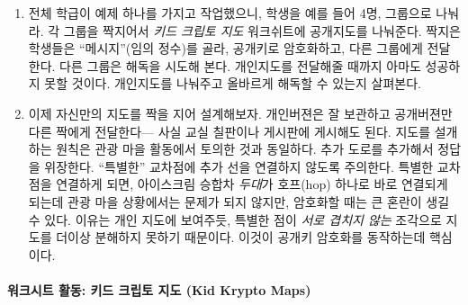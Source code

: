\documentclass[]{article}
\begin{document}
\begin{enumerate}
\item
  전체 학급이 예제 하나를 가지고 작업했으니, 학생을 예를 들어 4명,
  그룹으로 나눠라. 각 그룹을 짝지어서 \emph{키드 크립토 지도} 워크쉬트에
  공개지도를 나눠준다. 짝지은 학생들은 ``메시지''(임의 정수)를 골라,
  공개키로 암호화하고, 다른 그룹에게 전달한다. 다른 그룹은 해독을 시도해
  본다. 개인지도를 전달해줄 때까지 아마도 성공하지 못할 것이다.
  개인지도를 나눠주고 올바르게 해독할 수 있는지 살펴본다.
\item
  이제 자신만의 지도를 짝을 지어 설계해보자. 개인버젼은 잘 보관하고
  공개버젼만 다른 짝에게 전달한다--- 사실 교실 칠판이나 게시판에
  게시해도 된다. 지도를 설개하는 원칙은 관광 마을 활동에서 토의한 것과
  동일하다. 추가 도로를 추가해서 정답을 위장한다. ``특별한'' 교차점에
  추가 선을 연결하지 않도록 주의한다. 특별한 교차점을 연결하게 되면,
  아이스크림 승합차 \emph{두대}가 호프(hop) 하나로 바로 연결되게 되는데
  관광 마을 상황에서는 문제가 되지 않지만, 암호화할 때는 큰 혼란이 생길
  수 있다. 이유는 개인 지도에 보여주듯, 특별한 점이 \emph{서로 겹치지
  않는} 조각으로 지도를 더이상 분해하지 못하기 때문이다. 이것이 공개키
  암호화를 동작하는데 핵심이다.
\end{enumerate}

\mbox{}\paragraph{워크시트 활동: 키드 크립토 지도 (Kid Krypto
Maps)}\label{kid-krypto-maps}
\end{document}
